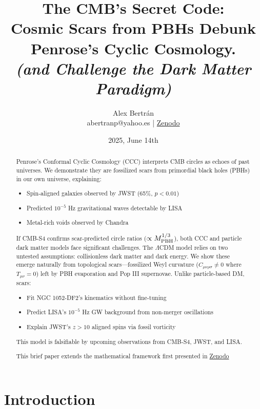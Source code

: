 \documentclass{article}
\title{
  \textbf{The CMB’s Secret Code:} \\
  \textbf{ Cosmic Scars from PBHs Debunk Penrose’s Cyclic Cosmology.} \\
    \vspace{0.5em}
  \normalfont\large\textit{(and Challenge the Dark Matter Paradigm)} \\
  \vspace{1em}
  \normalfont\normalsize
  \let\thefootnote\relax\footnotetext{%
    This work is licensed under a \href{https://creativecommons.org/licenses/by/4.0/}{Creative Commons Attribution 4.0 International License}. 
  }
}
\author{Alex Bertrán \\ 
  \small{abertranp@yahoo.es | \href{https://zenodo.org/records/15665190}{Zenodo}} \\ }
\date{2025, June 14th}
\begin{document}
\maketitle

\begin{abstract}
Penrose's Conformal Cyclic Cosmology (CCC) interprets CMB circles as echoes of past universes. We demonstrate they are fossilized scars from primordial black holes (PBHs) in our own universe, explaining:
\begin{itemize}
    \item Spin-aligned galaxies observed by JWST (65\%, $p < 0.01$)
    \item Predicted $10^{-5}$ Hz gravitational waves detectable by LISA
    \item Metal-rich voids observed by Chandra
\end{itemize}

If CMB-S4 confirms scar-predicted circle ratios ($\propto M_{\rm PBH}^{1/3}$), both CCC and particle dark matter models face significant challenges. The $\Lambda$CDM model relies on two untested assumptions: collisionless dark matter and dark energy. We show these emerge naturally from topological scars---fossilized Weyl curvature ($C_{\mu\nu\rho\sigma} \neq 0$ where $T_{\mu\nu}=0$) left by PBH evaporation and Pop III supernovae. Unlike particle-based DM, scars:
\begin{itemize}
    \item Fit NGC 1052-DF2's kinematics without fine-tuning
    \item Predict LISA's $10^{-5}$ Hz GW background from non-merger oscillations
    \item Explain JWST's $z>10$ aligned spins via fossil vorticity
\end{itemize}\par
\vspace{0.5em}
This model is falsifiable by upcoming observations from CMB-S4, JWST, and LISA.\par
\vspace{0.5em}
This brief paper extends the mathematical framework first presented in \cite{bertran2025cosmic} \href{https://zenodo.org/records/15270535}{Zenodo} \\

\end{abstract}

\section{Introduction}
\end{document}

